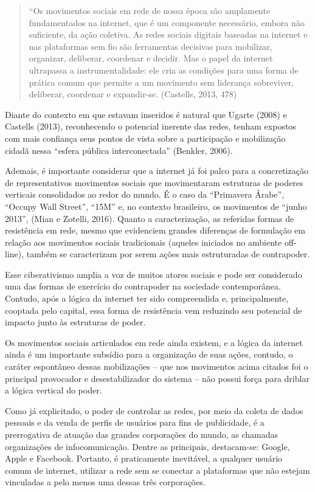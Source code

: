 \begin{quote}
``Os movimentos sociais em rede de nossa época são amplamente
fundamentados na internet, que é um componente necessário, embora não
suficiente, da ação coletiva. As redes sociais digitais baseadas na
internet e nas plataformas sem fio são ferramentas decisivas para
mobilizar, organizar, deliberar, coordenar e decidir. Mas o papel da
internet ultrapassa a instrumentalidade: ele cria as condições para uma
forma de prática comum que permite a um movimento sem liderança
sobreviver, deliberar, coordenar e expandir-se. (Castells, 2013, 478)
\end{quote}

Diante do contexto em que estavam inseridos é natural que Ugarte (2008)
e Castells (2013), reconhecendo o potencial inerente das redes, tenham
expostos com mais confiança seus pontos de vista sobre a participação e
mobilização cidadã nessa ``esfera pública interconectada'' (Benkler,
2006).

Ademais, é importante considerar que a internet já foi palco para a
concretização de representativos movimentos sociais que movimentaram
estruturas de poderes verticais consolidados ao redor do mundo. É o caso
da ``Primavera Árabe'', ``Occupy Wall Street'', ``15M'' e, no contexto
brasileiro, os movimentos de ``junho 2013'', (Mian e Zotelli, 2016).
Quanto a caracterização, as referidas formas de resistência em rede,
mesmo que evidenciem grandes diferenças de formulação em relação aos
movimentos sociais tradicionais (aqueles iniciados no ambiente
off-line), também se caracterizam por serem ações mais estruturadas de
contrapoder.

Esse ciberativismo amplia a voz de muitos atores sociais e pode ser
considerado uma das formas de exercício do contrapoder na sociedade
contemporânea. Contudo, após a lógica da internet ter sido compreendida
e, principalmente, cooptada pelo capital, essa forma de resistência vem
reduzindo seu potencial de impacto junto às estruturas de poder.

Os movimentos sociais articulados em rede ainda existem, e a lógica da
internet ainda é um importante subsídio para a organização de suas
ações, contudo, o caráter espontâneo dessas mobilizações -- que nos
movimentos acima citados foi o principal provocador e desestabilizador
do sistema -- não possui força para driblar a lógica vertical do poder.

Como já explicitado, o poder de controlar as redes, por meio da coleta
de dados pessoais e da venda de perfis de usuários para fins de
publicidade, é a prerrogativa de atuação das grandes corporações do
mundo, as chamadas organizações de infocomunicação. Dentre as
principais, destacam-se: Google, Apple e Facebook. Portanto, é
praticamente inevitável, a qualquer usuário comum de internet, utilizar
a rede sem se conectar a plataformas que não estejam vinculadas a pelo
menos uma dessas três corporações.

